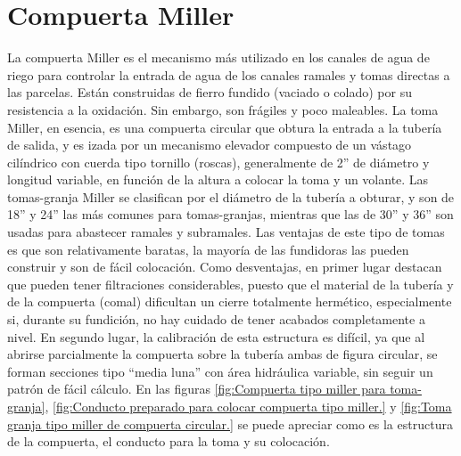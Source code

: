 \section{Compuerta Miller}
\label{sec:Compuertas miller}
La compuerta Miller es el mecanismo más utilizado en los canales de agua de riego para controlar la entrada de agua de los canales ramales y tomas directas a las parcelas. Están construidas de fierro fundido (vaciado o colado) por su resistencia a la oxidación. Sin embargo, son frágiles y poco maleables. La toma Miller, en esencia, es una compuerta circular que obtura la entrada a la tubería de salida, y es izada por un mecanismo elevador compuesto de un vástago cilíndrico con cuerda tipo tornillo (roscas), generalmente de 2” de diámetro y longitud variable, en función de la altura a colocar la toma y un volante.
Las tomas-granja Miller se clasifican por el diámetro de la tubería a obturar, y son de 18” y 24” las más comunes para tomas-granjas, mientras que las de 30” y 36” son usadas para abastecer ramales y subramales.
Las ventajas de este tipo de tomas es que son relativamente baratas, la mayoría de las fundidoras las pueden construir y son de fácil colocación. Como desventajas, en primer lugar destacan que pueden tener filtraciones considerables, puesto que el material de la tubería y de la compuerta (comal) dificultan un cierre totalmente hermético, especialmente si, durante su fundición, no hay cuidado de tener acabados completamente a nivel. En segundo lugar, la calibración de esta estructura es difícil, ya que al abrirse parcialmente la compuerta sobre la tubería ambas de figura circular, se forman secciones tipo “media luna” con área hidráulica variable, sin seguir un patrón de fácil cálculo. 
En las figuras \ref{fig:Compuerta tipo miller para toma-granja}, \ref{fig:Conducto preparado para colocar compuerta tipo miller.} y \ref{fig:Toma granja tipo miller de compuerta circular.} se puede apreciar como es la estructura de la compuerta, el conducto para la toma y su colocación.

